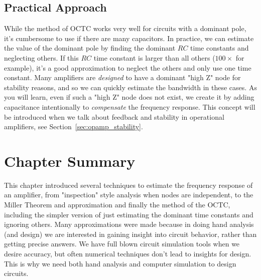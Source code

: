 \subsection{Practical Approach}
While the method of OCTC works very well for circuits with a dominant pole, it's cumbersome to use if there are many capacitors.  In practice, we can estimate the value of the dominant pole by finding the dominant $RC$ time constants and neglecting others.  If this $RC$ time constant is larger than all others ($100\times$ for example), it's a good approximation to neglect the others and only use one time constant. Many amplifiers are \textit{designed} to have a dominant "high Z" node for stability reasons, and so we can quickly estimate the bandwidth in these cases.  As you will learn, even if such a "high Z" node does not exist, we create it by adding capacitance intentionally to \textit{compensate} the frequency response.  This concept will be introduced when we talk about feedback and stability in operational amplifiers, see Section~\ref{sec:opamp_stability}.
\section{Chapter Summary}
This chapter introduced several techniques to estimate the frequency response of an amplifier, from "inspection" style analysis when nodes are independent, to the Miller Theorem and approximation and finally the method of the OCTC, including the simpler version of just estimating the dominant time constants and ignoring others.  Many approximations were made because in doing hand analysis (and design) we are interested in gaining insight into circuit behavior, rather than getting precise answers.  We have full blown circuit simulation tools when we desire accuracy, but often numerical techniques don't lead to insights for design.  This is why we need both hand analysis and computer simulation to design circuits.
